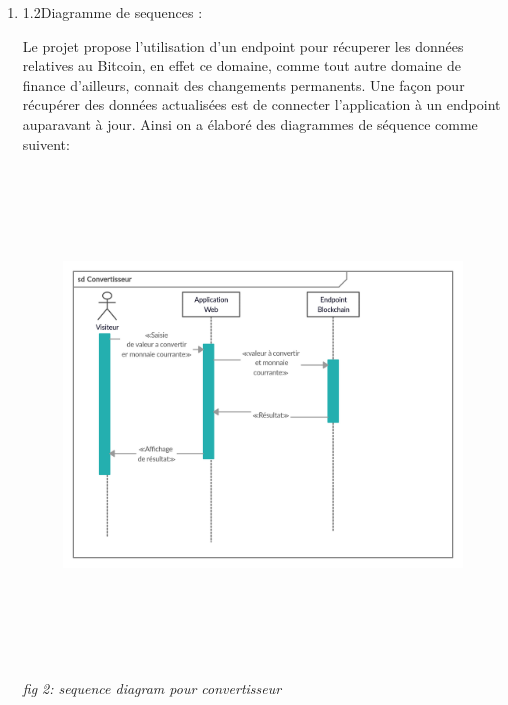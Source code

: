 \documentclass[12pt]{article}
\begin{document}
\begin{enumerate}
\begin{enumerate}
\vspace{\baselineskip}

\vspace{\baselineskip}
	\item 1.2\tab Diagramme de sequences :\par

Le projet propose l’utilisation d’un endpoint pour récuperer les données relatives au Bitcoin, en effet ce domaine, comme tout autre domaine de finance d’ailleurs, connait des changements permanents. Une façon pour récupérer des données actualisées est de connecter l’application à un endpoint auparavant à jour. Ainsi on a élaboré des diagrammes de séquence comme suivent:\par




\begin{figure}[H]
	\begin{Center}
		\includegraphics[width=6.69in,height=5.13in]{./media/image3.png}
	\end{Center}
\end{figure}



\textit{fig 2: sequence diagram pour convertisseur}\par


\vspace{\baselineskip}





\end{enumerate}
\end{enumerate}
\end{document}
